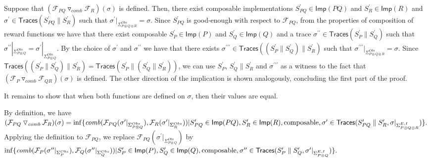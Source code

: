 \documentclass[10pt,a4paper]{article}
\begin{document}
 
Suppose that $({{\mathcal{F}_{PQ}}\mathbin{\triangledown_{\mathit{comb}}}{\mathcal{F}_{R}}})(\sigma)$ is defined. Then, there exist composable implementations $S_{PQ}^{\prime}\in\mathsf{Imp}(PQ)$ and $S_{R}^{\prime}\in\mathsf{Imp}(R)$ and $\sigma^{\prime}\in\mathsf{Traces}(S_{PQ}^{\prime}\parallel S_{R}^{\prime})$ such that $\sigma^{\prime}|_{\Sigma_{P\otimes Q\otimes R}^{Obs}}=\sigma$. Since $S_{PQ}^{\prime}$ is good-enough with respect to $\mathcal{F}_{PQ}$, from the properties of composition of reward functions we have that there exist composable $S_{P}^{\prime}\in\mathsf{Imp}(P)$ and $S_{Q}^{\prime}\in\mathsf{Imp}(Q)$ and a trace $\sigma^{\prime\prime}\in\mathsf{Traces}(S_{P}^{\prime}\parallel S_{Q}^{\prime})$ such that $\sigma^{\prime\prime}|_{\Sigma_{P\otimes Q}^{Obs}}=\sigma^{\prime}|_{\Sigma_{P\otimes Q}^{Obs}}$. By the choice of $\sigma^{\prime}$ and $\sigma^{\prime\prime}$ we have that there exists $\sigma^{\prime\prime\prime}\in\mathsf{Traces}((S_{P}^{\prime}\parallel S_{Q}^{\prime})\parallel S_{R}^{\prime})$ such that $\sigma^{\prime\prime\prime}|_{\Sigma_{P\otimes Q\otimes R}^{Obs}}=\sigma$. Since $\mathsf{Traces}((S_{P}^{\prime}\parallel S_{Q}^{\prime})\parallel S_{R}^{\prime})=\mathsf{Traces}(S_{P}^{\prime}\parallel(S_{Q}^{\prime}\parallel S_{R}^{\prime}))$, we can use $S_{P}^{\prime}$, $S_{Q}^{\prime}\parallel S_{R}^{\prime}$ and $\sigma^{\prime\prime\prime}$ as a witness to the fact that $({{\mathcal{F}_{P}}\mathbin{\triangledown_{\mathit{comb}}}{\mathcal{F}_{QR}}})(\sigma)$ is defined. The other direction of the implication is shown analogously, concluding the first part of the proof.\par
 
 
 
It remains to show that when both functions are defined on $\sigma$, then their values are equal.\par
 
 
 
By definition, we have $({{\mathcal{F}_{PQ}}\mathbin{\triangledown_{\mathit{comb}}}{\mathcal{F}_{R}}})(\sigma)=\inf\{\mathit{comb}(\mathcal{F}_{PQ}(\sigma^{\prime}|_{\Sigma_{P\otimes Q}^{Obs}}),\mathcal{F}_{R}(\sigma^{\prime}|_{\Sigma_{R}^{Obs}}))|\\
S^{\prime}_{PQ}\in\mathsf{Imp}(PQ),S^{\prime}_{R}\in\mathsf{Imp}(R),\text{composable},\sigma^{\prime}\in\mathsf{Traces}(S^{\prime}_{PQ}\parallel S^{\prime}_{R},\sigma|_{\Sigma_{P\otimes Q\otimes R}^{E,I}})\}.$ Applying the definition to $\mathcal{F}_{PQ}$, we replace $\mathcal{F}_{PQ}(\sigma^{\prime}|_{\Sigma_{P\otimes Q}^{Obs}})$ by $\inf\{\mathit{comb}(\mathcal{F}_{P}(\sigma^{\prime\prime}|_{\Sigma_{P}^{Obs}}),\mathcal{F}_{Q}(\sigma^{\prime\prime}|_{\Sigma_{Q}^{Obs}}))|\\
S^{\prime}_{P}\in\mathsf{Imp}(P),S^{\prime}_{Q}\in\mathsf{Imp}(Q),\text{composable},\sigma^{\prime\prime}\in\mathsf{Traces}(S^{\prime}_{P}\parallel S^{\prime}_{Q},\sigma^{\prime}|_{\Sigma_{P\otimes Q}^{E,I}})\}.$\par
 
\end{document}
